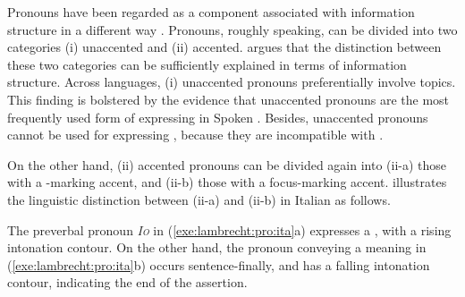 Pronouns have been regarded as a component associated with information
structure in a different way \citep{lambrecht:96}.  Pronouns, roughly
speaking, can be divided into two categories (i) unaccented and (ii)
accented. \citeauthor{lambrecht:96} argues that the distinction
between these two categories can be sufficiently explained in terms of
information structure.  Across languages, (i) unaccented pronouns
preferentially involve topics.  This finding is bolstered by the
evidence that unaccented pronouns are the most frequently used form of
expressing  in Spoken  \citep{lambrecht:86}.
Besides, unaccented pronouns cannot be used for expressing
, because they are incompatible with
.


\noindent On the other hand, (ii) accented pronouns can be divided
again into (ii-a) those with a -marking accent, and (ii-b)
those with a focus-marking accent. \citeauthor{lambrecht:96}
illustrates the linguistic distinction between (ii-a) and (ii-b) in
Italian as follows.



\noindent The preverbal pronoun \textit{\textsc{Io}} in
(\ref{exe:lambrecht:pro:ita}a) expresses a , with a rising
intonation contour. On the other hand, the pronoun conveying a
 meaning in (\ref{exe:lambrecht:pro:ita}b) occurs
sentence-finally, and has a falling intonation contour, indicating the
end of the assertion.


